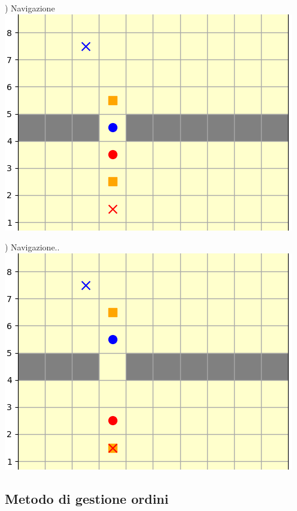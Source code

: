 \documentclass[12pt]{article}
\begin{document}
\noindent\begin{minipage}[ht]{0.45\linewidth}
) Navigazione
\includegraphics[width=\textwidth]{SimulazioniNavigazione/2AGV_ConflittoWait/4t.png}
\end{minipage}
\begin{minipage}[ht]{0.45\linewidth}
) Navigazione..
\includegraphics[width=\textwidth]{SimulazioniNavigazione/2AGV_ConflittoWait/5t.png}
\end{minipage}

\newpage


\subsection{Metodo di gestione ordini}
\end{document}
